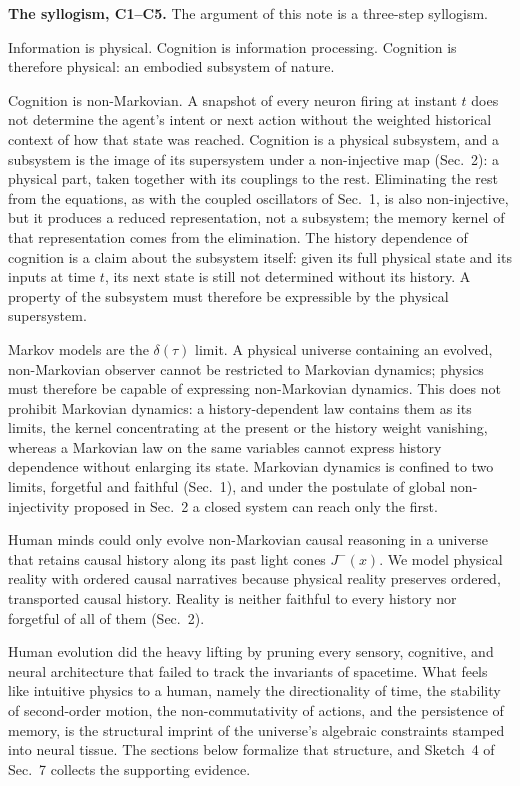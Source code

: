 \documentclass[10pt]{article}
\begin{document}
\smallskip
\noindent\textbf{The syllogism, C1--C5.} The argument of this note is a three-step syllogism.
\begin{description}\itemsep1pt
\item[C1, C2.] Information is physical. Cognition is information processing. Cognition is therefore physical: an embodied subsystem of nature.
\item[C3.] Cognition is non-Markovian. A snapshot of every neuron firing at instant $t$ does not determine the agent's intent or next action without the weighted historical context of how that state was reached. Cognition is a physical subsystem, and a subsystem is the image of its supersystem under a non-injective map (Sec.~2): a physical part, taken together with its couplings to the rest. Eliminating the rest from the equations, as with the coupled oscillators of Sec.~1, is also non-injective, but it produces a reduced representation, not a subsystem; the memory kernel of that representation comes from the elimination. The history dependence of cognition is a claim about the subsystem itself: given its full physical state and its inputs at time $t$, its next state is still not determined without its history. A property of the subsystem must therefore be expressible by the physical supersystem.
\item[C4, C5.] Markov models are the $\delta(\tau)$ limit. A physical universe containing an evolved, non-Markovian observer cannot be restricted to Markovian dynamics; physics must therefore be capable of expressing non-Markovian dynamics. This does not prohibit Markovian dynamics: a history-dependent law contains them as its limits, the kernel concentrating at the present or the history weight vanishing, whereas a Markovian law on the same variables cannot express history dependence without enlarging its state. Markovian dynamics is confined to two limits, forgetful and faithful (Sec.~1), and under the postulate of global non-injectivity proposed in Sec.~2 a closed system can reach only the first.
\end{description}
Human minds could only evolve non-Markovian causal reasoning in a universe that retains causal history along its past light cones $J^-(x)$. We model physical reality with ordered causal narratives because physical reality preserves ordered, transported causal history. Reality is neither faithful to every history nor forgetful of all of them (Sec.~2).

Human evolution did the heavy lifting by pruning every sensory, cognitive, and neural architecture that failed to track the invariants of spacetime. What feels like intuitive physics to a human, namely the directionality of time, the stability of second-order motion, the non-commutativity of actions, and the persistence of memory, is the structural imprint of the universe's algebraic constraints stamped into neural tissue. The sections below formalize that structure, and Sketch~4 of Sec.~7 collects the supporting evidence.
\end{document}
